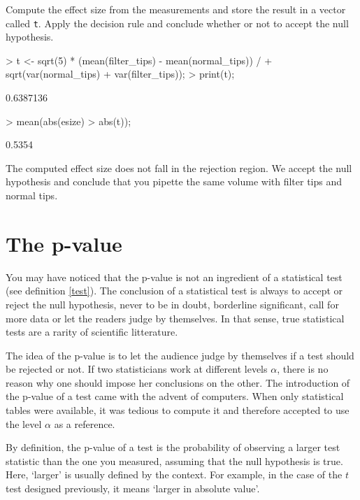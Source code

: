 \documentclass[a4paper]{article}
\theoremstyle{definition}
\begin{document}
\begin{Exercise}
Compute the effect size from the measurements and store the result in a
vector called \texttt{t}. Apply the decision rule
and conclude whether or not to accept the null hypothesis.
\end{Exercise}
\begin{Answer}
\begin{Schunk}
\begin{Sinput}
> t <- sqrt(5) * (mean(filter_tips) - mean(normal_tips)) /
+    sqrt(var(normal_tips) + var(filter_tips));
> print(t);
\end{Sinput}
\begin{Soutput}
[1] 0.6387136
\end{Soutput}
\begin{Sinput}
> mean(abs(esize) > abs(t));
\end{Sinput}
\begin{Soutput}
[1] 0.5354
\end{Soutput}
\end{Schunk}
\par
The computed effect size does not fall in the rejection region.
We accept the null hypothesis and conclude that you pipette the same
volume with filter tips and normal tips.
\end{Answer}


\section{The p-value}

You may have noticed that the p-value is not an ingredient of a statistical
test (see definition \ref{test}). The conclusion of a statistical test
is always to accept or reject the null hypothesis, never to be in doubt,
borderline significant, call for more data or let the readers judge by
themselves. In that sense, true statistical tests are a rarity of
scientific litterature.

The idea of the p-value is to let the audience judge by themselves if
a test should be rejected or not. If two statisticians work at different
levels $\alpha$, there is no reason why one should impose her conclusions
on the other. The introduction of the p-value of a test came with the advent
of computers. When only statistical tables were available, it was tedious
to compute it and therefore accepted to use the level $\alpha$ as a
reference.

By definition, the p-value of a test is the probability of observing
a larger test statistic than the one you measured, assuming that the null
hypothesis is true. Here, `larger' is usually defined by the context.
For example, in the case of the $t$ test designed previously, it means
`larger in absolute value'.
\end{document}
